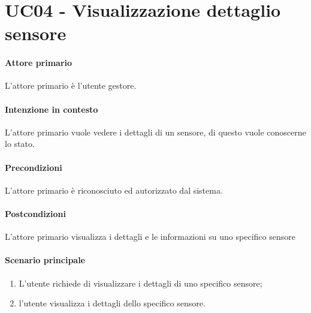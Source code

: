 \section{UC04 - Visualizzazione dettaglio sensore}\label{uc:04}
\paragraph{Attore primario} L'attore primario è l'utente gestore.
\paragraph{Intenzione in contesto} L'attore primario vuole vedere i dettagli di un sensore, di questo vuole conoscerne lo stato.
\paragraph{Precondizioni}L'attore primario è riconosciuto ed autorizzato dal sistema.
\paragraph{Postcondizioni} L'attore primario visualizza i dettagli e le informazioni su uno specifico sensore
\paragraph{Scenario principale}
\begin{enumerate}
    \item L'utente richiede di visualizzare i dettagli di uno specifico sensore;
    \item l'utente visualizza i dettagli dello specifico sensore.
\end{enumerate}